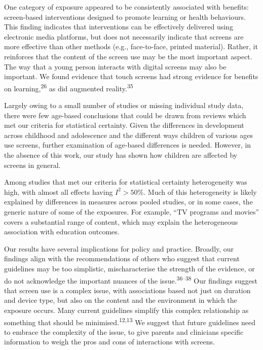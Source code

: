 \documentclass[
  english,
  man]{apa6}
\begin{document}
One category of exposure appeared to be consistently associated with benefits: screen-based interventions designed to promote learning or health behaviours.
This finding indicates that interventions can be effectively delivered using electronic media platforms, but does not necessarily indicate that screens are more effective than other methods (e.g., face-to-face, printed material).
Rather, it reinforces that the content of the screen use may be the most important aspect.
The way that a young person interacts with digital screens may also be important.
We found evidence that touch screens had strong evidence for benefits on learning,\textsuperscript{26} as did augmented reality.\textsuperscript{35}

Largely owing to a small number of studies or missing individual study data, there were few age-based conclusions that could be drawn from reviews which met our criteria for statistical certainty.
Given the differences in development across childhood and adolescence and the different ways children of various ages use screens, further examination of age-based differences is needed.
However, in the absence of this work, our study has shown how children are affected by screens in general.

Among studies that met our criteria for statistical certainty heterogeneity was high, with almost all effects having \(I^2 > 50\%\).
Much of this heterogeneity is likely explained by differences in measures across pooled studies, or in some cases, the generic nature of some of the exposures.
For example, ``TV programs and movies'' covers a substantial range of content, which may explain the heterogeneous association with education outcomes.

Our results have several implications for policy and practice.
Broadly, our findings align with the recommendations of others who suggest that current guidelines may be too simplistic, mischaracterise the strength of the evidence, or do not acknowledge the important nuances of the issue.\textsuperscript{36--38}
Our findings suggest that screen use is a complex issue, with associations based not just on duration and device type, but also on the content and the environment in which the exposure occurs.
Many current guidelines simplify this complex relationship as something that should be minimised.\textsuperscript{12,13}
We suggest that future guidelines need to embrace the complexity of the issue, to give parents and clinicians specific information to weigh the pros and cons of interactions with screens.
\end{document}
